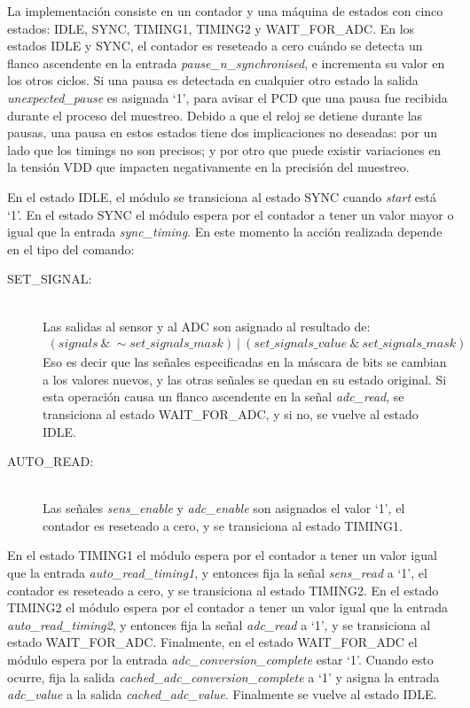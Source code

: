 \documentclass[a4paper, twoside, 11pt]{report}
\begin{document}
La implementación consiste en un contador y una máquina de estados con cinco estados: IDLE, SYNC, TIMING1, TIMING2 y WAIT\_FOR\_ADC. En los estados IDLE y SYNC, el contador es reseteado a cero cuándo se detecta un flanco ascendente en la entrada \textit{pause\_n\_synchronised}, e incrementa su valor en los otros ciclos. Si una pausa es detectada en cualquier otro estado la salida \textit{unexpected\_pause} es asignada ‘1’, para avisar el PCD que una pausa fue recibida durante el proceso del muestreo. Debido a que el reloj se detiene durante las pausas, una pausa en estos estados tiene dos implicaciones no deseadas:  por un lado que los timings no son precisos; y por otro que puede existir variaciones en la tensión VDD que impacten negativamente en  la precisión del muestreo.

En el estado IDLE, el módulo se transiciona al estado SYNC cuando \textit{start} está ‘1’. En el estado SYNC el módulo espera por el contador a tener un valor mayor o igual que la entrada \textit{sync\_timing}. En este momento la acción realizada depende en el tipo del comando:

\begin{description}
  \item[SET\_SIGNAL:] \hfill \\ Las salidas al sensor y al ADC son asignado al resultado de:
  \begin{align*}
      \left(\textit{signals}~\&~\sim\textit{set\_signals\_mask}\right)~|~\left(\textit{set\_signals\_value}~\&~\textit{set\_signals\_mask}\right)
  \end{align*}
  Eso es decir que las señales especificadas en la máscara de bits se cambian a los valores nuevos, y las otras señales se quedan en su estado original. Si esta operación causa un flanco ascendente en la señal \textit{adc\_read}, se transiciona al estado WAIT\_FOR\_ADC, y si no, se vuelve al estado IDLE.
  \item[AUTO\_READ:] \hfill \\ Las señales \textit{sens\_enable} y \textit{adc\_enable} son asignados el valor ‘1’, el contador es reseteado a cero, y se transiciona al estado TIMING1.
\end{description}

En el estado TIMING1 el módulo espera por el contador a tener un valor igual que la entrada \textit{auto\_read\_timing1}, y entonces fija la señal \textit{sens\_read} a ‘1’, el contador es reseteado a cero, y se transiciona al estado TIMING2. En el estado TIMING2 el módulo espera por el contador a tener un valor igual que la entrada \textit{auto\_read\_timing2}, y entonces fija la señal \textit{adc\_read} a ‘1’, y se transiciona al estado WAIT\_FOR\_ADC. Finalmente, en el estado WAIT\_FOR\_ADC el módulo espera por la entrada \textit{adc\_conversion\_complete} estar ‘1’. Cuando esto ocurre, fija la salida \textit{cached\_adc\_conversion\_complete} a ‘1’ y asigna la entrada \textit{adc\_value} a la salida \textit{cached\_adc\_value}. Finalmente se vuelve al estado IDLE.
\end{document}
